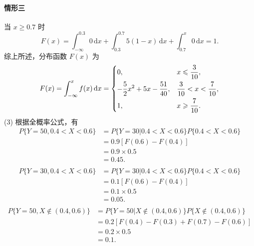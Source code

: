 \documentclass{article}
\begin{document}
\begin{solution}
    \paragraph{情形三} 当 $x \geqslant 0.7$ 时
    $$
        F(x) = \int_{-\infty}^{0.3}0\,\mathrm{d}x + \int_{0.3}^{0.7}5(1-x)\,\mathrm{d}x + \int_{0.7}^{x} 0\,\mathrm{d}x = 1.
    $$
    综上所述，分布函数 $F(x)$ 为
    $$
        F(x) = \int_{-\infty}^x f(x) \,\mathrm{d}x
        = \begin{dcases}
            0,                                    & x \leqslant \frac{3}{10},    \\
            -\frac{5}{2}x^2 + 5x - \frac{51}{40}, & \frac{3}{10}<x<\frac{7}{10}, \\
            1,                                    & x \geqslant \frac{7}{10}.
        \end{dcases}
    $$
    (3) 根据全概率公式，有
    $$
        \begin{aligned}
            P\{Y=50 , 0.4<X<0.6\}
             & = P\{Y=30 | 0.4<X<0.6\}P\{0.4<X<0.6\} \\
             & = 0.9 [F(0.6)-F(0.4)]                 \\
             & = 0.9 \times 0.5                      \\
             & = 0.45.                               \\
        \end{aligned}
    $$
    $$
        \begin{aligned}
            P\{Y=30, 0.4<X<0.6\}
             & = P\{Y=30 | 0.4<X<0.6\}P\{0.4<X<0.6\} \\
             & = 0.1 [F(0.6)-F(0.4)]                 \\
             & = 0.1 \times 0.5                      \\
             & = 0.05.                               \\
        \end{aligned}
    $$
    $$
        \begin{aligned}
            P\{Y=50 , X \notin (0.4,0.6)\}
             & = P\{Y=50 |  X \notin (0.4,0.6)\}P\{X \notin (0.4,0.6)\} \\
             & = 0.2 [F(0.4)-F(0.3) + F(0.7)-F(0.6)]                    \\
             & = 0.2 \times 0.5                                         \\
             & = 0.1.                                                   \\

\end{aligned}$$
\end{solution}
\end{document}
